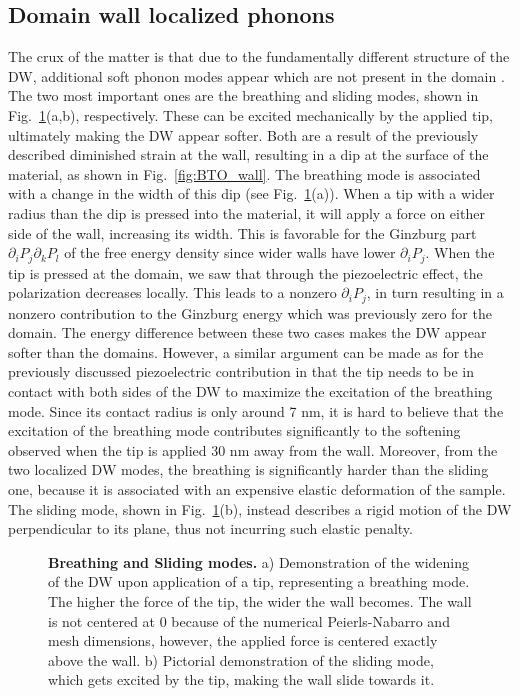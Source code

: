 \subsection{Domain wall localized phonons}
The crux of the matter is that due to the fundamentally different structure of the \gls{DW}, additional soft phonon modes appear which are not present in the domain \cite{Chen2020}.
The two most important ones are the breathing and sliding modes, shown in Fig.~\ref{fig:BTO_breathing_sliding}(a,b), respectively.
These can be excited mechanically by the applied tip, ultimately making the \gls{DW} appear softer.
Both are a result of the previously described diminished strain at the wall, resulting in a dip at the surface of the material, as shown in Fig.~\ref{fig:BTO_wall}.
The breathing mode is associated with a change in the width of this dip (see Fig.~\ref{fig:BTO_breathing_sliding}(a)).
When a tip with a wider radius than the dip is pressed into the material, it will apply a force on either side of the wall, increasing its width.
This is favorable for the Ginzburg part $\partial_i P_j \partial_k P_l$ of the free energy density since wider walls have lower $\partial_i P_j$.
When the tip is pressed at the domain, we saw that through the piezoelectric effect, the polarization decreases locally.
This leads to a nonzero $\partial_i P_j$, in turn resulting in a nonzero contribution to the Ginzburg energy which was previously zero for the domain.
The energy difference between these two cases makes the \gls{DW} appear softer than the domains.
However, a similar argument can be made as for the previously discussed piezoelectric contribution in that the tip needs to be in contact with both sides of the \gls{DW} to maximize the excitation of the breathing mode.
Since its contact radius is only around 7 nm, it is hard to believe that the excitation of the breathing mode contributes significantly to the softening observed when the tip is applied 30 nm away from the wall.
Moreover, from the two localized \gls{DW} modes, the breathing is significantly harder than the sliding one, because it is associated with an expensive elastic deformation of the sample.
The sliding mode, shown in Fig.~\ref{fig:BTO_breathing_sliding}(b), instead describes a rigid motion of the \gls{DW} perpendicular to its plane, thus not incurring such elastic penalty. 
\begin{figure}
	\caption{\label{fig:BTO_breathing_sliding}{\bf Breathing and Sliding modes.} a) Demonstration of the widening of the \gls{DW} upon application of a tip, representing a breathing mode. The higher the force of the tip, the wider the wall becomes. The wall is not centered at 0 because of the numerical Peierls-Nabarro and mesh dimensions, however, the applied force is centered exactly above the wall. b) Pictorial demonstration of the sliding mode, which gets excited by the tip, making the wall slide towards it.}
\end{figure}

